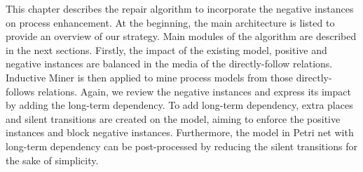 

This chapter describes the repair algorithm to incorporate the negative instances on process enhancement. At the beginning, the main architecture is listed to provide an overview of our strategy. Main modules of the algorithm are described in the next sections. Firstly, the impact of the existing model, positive and negative instances are balanced in the media of the directly-follow relations. Inductive Miner is then applied to mine process models from those directly-follows relations. Again, we review the negative instances and express its impact by adding the long-term dependency. To add long-term dependency, extra places and silent transitions are created on the model, aiming to enforce the positive instances and block negative instances. Furthermore, the model in Petri net with long-term dependency can be  post-processed by reducing the silent transitions for the sake of simplicity.

